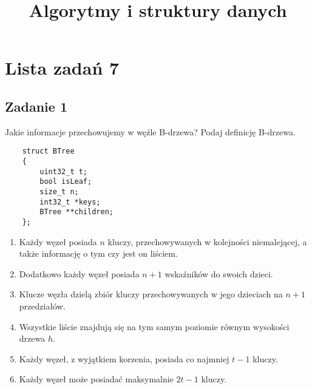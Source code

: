 \documentclass{article}
\begin{document}
\title{Algorytmy i struktury danych}
\author{}
\date{}
\maketitle

\section*{Lista zadań 7}

\subsection*{Zadanie 1}
Jakie informacje przechowujemy w węźle B-drzewa? Podaj definicję B-drzewa.
\begin{lstlisting}
    struct BTree
    {
        uint32_t t;
        bool isLeaf;
        size_t n;
        int32_t *keys;
        BTree **children;
    };
\end{lstlisting}
\begin{enumerate}
    \item Każdy węzeł posiada $n$ kluczy, przechowywanych w kolejności niemalejącej, a także informację o tym czy jest
          on liściem.
    \item Dodatkowo każdy węzeł posiada $n+1$ wskaźników do swoich dzieci.
    \item Klucze węzła dzielą zbiór kluczy przechowywanych w jego dzieciach na $n+1$ przedziałów.
    \item Wszystkie liście znajdują się na tym samym poziomie równym wysokości drzewa $h$.
    \item Każdy węzeł, z wyjątkiem korzenia, posiada co najmniej $t-1$ kluczy.
    \item Każdy węzeł może posiadać maksymalnie $2t-1$ kluczy.
\end{enumerate}
\end{document}
